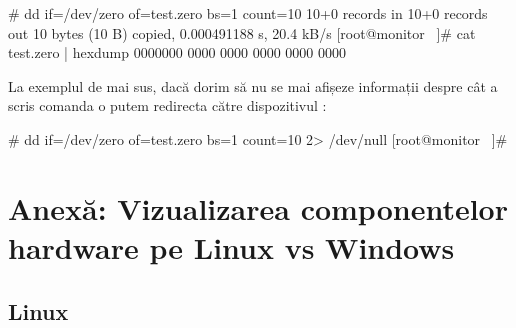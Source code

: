 \begin{screen}
# dd if=/dev/zero of=test.zero bs=1 count=10
10+0 records in
10+0 records out
10 bytes (10 B) copied, 0.000491188 s, 20.4 kB/s
[root@monitor ~]# cat test.zero | hexdump
0000000 0000 0000 0000 0000 0000
\end{screen}

La exemplul de mai sus, dacă dorim să nu se mai afișeze informații despre cât a
scris comanda  o putem redirecta către dispozitivul :

\begin{screen}
# dd if=/dev/zero of=test.zero bs=1 count=10 2> /dev/null
[root@monitor ~]#
\end{screen}

\section{Anexă: Vizualizarea componentelor hardware pe Linux vs Windows}
\label{sec:hardware-virtualizare}

\subsection{Linux}
\label{sec:hardware-virtualizare-linux}

